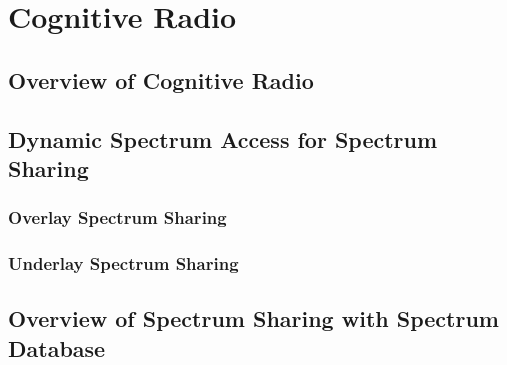 \chapter[CognitiveRadio]{Cognitive Radio}
\label{chapter:CR}

\section{Overview of Cognitive Radio}

\section{Dynamic Spectrum Access for Spectrum Sharing}
    \subsection{Overlay Spectrum Sharing}
    \subsection{Underlay Spectrum Sharing}

\section{Overview of Spectrum Sharing with Spectrum Database}
